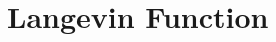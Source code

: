 \documentclass[../../PS3.tex]{subfiles}
\begin{document}
\section{Langevin Function}
\end{document}
